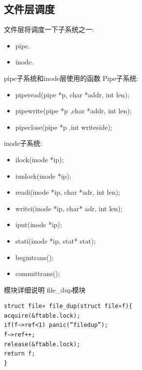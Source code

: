 \documentclass[a4paper,12pt]{report}
\begin{document}
\subsection{文件层调度}

文件层将调度一下子系统之一:
\begin{itemize}
  \item pipe.
 \item inode.
\end{itemize}

pipe子系统和inode层使用的函数
Pipe子系统:
\begin{itemize}
  \item piperead(pipe *p, char *addr, int len);
 \item pipewrite(pipe *p ,char *addr, int len);
 \item pipeclose(pipe *p ,int writeside);
\end{itemize}

inode子系统:
\begin{itemize}
  \item ilock(inode *ip);
  \item iunlock(inode *ip);
 \item readi(inode *ip, char *adr, int len);
 \item writei(inode *ip, char* adr, int len);
 \item iput(inode *ip);
 \item stati(inode *ip, stat* stat);
 \item begintrans();
 \item committrans();
\end{itemize}




模块详细说明
file\_dup模块
\begin{lstlisting}
struct file∗ file_dup(struct file∗f){
acquire(&ftable.lock);
if(f−>ref<1) panic(”filedup”);
f−>ref++;
release(&ftable.lock);
return f;
}
\end{lstlisting}
\end{document}
